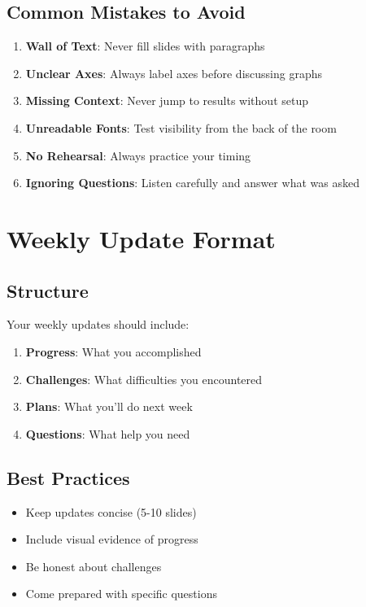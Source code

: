 \documentclass[11pt,a4paper]{article}
\begin{document}
\subsection{Common Mistakes to Avoid}

\begin{tcolorbox}[colback=red!10,colframe=red!50,title=Don't Do This!]
\begin{enumerate}
    \item \textbf{Wall of Text}: Never fill slides with paragraphs
    \item \textbf{Unclear Axes}: Always label axes before discussing graphs
    \item \textbf{Missing Context}: Never jump to results without setup
    \item \textbf{Unreadable Fonts}: Test visibility from the back of the room
    \item \textbf{No Rehearsal}: Always practice your timing
    \item \textbf{Ignoring Questions}: Listen carefully and answer what was asked
\end{enumerate}
\end{tcolorbox}


\section{Weekly Update Format}

\subsection{Structure}
Your weekly updates should include:
\begin{enumerate}
    \item \textbf{Progress}: What you accomplished
    \item \textbf{Challenges}: What difficulties you encountered
    \item \textbf{Plans}: What you'll do next week
    \item \textbf{Questions}: What help you need
\end{enumerate}

\subsection{Best Practices}
\begin{itemize}
    \item Keep updates concise (5-10 slides)
    \item Include visual evidence of progress
    \item Be honest about challenges
    \item Come prepared with specific questions
\end{itemize}
\end{document}
